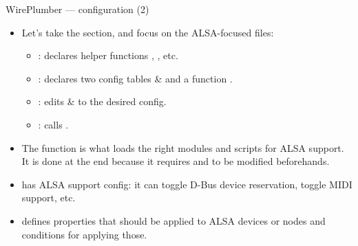\begin{frame}{WirePlumber — configuration (2)}
  \begin{itemize}

  \item Let's take the  section, and focus on the
    ALSA-focused files:

    \begin{itemize}
    \item {}: declares helper functions
      , , etc.
    \item {}: declares two config tables
       \&  and a
      function .
    \item {}: edits 
      \&  to the desired config.
    \item {}: calls .
    \end{itemize}

  \item The  function is what loads the right modules
    and scripts for ALSA support. It is done at the end because it
    requires  and  to be modified
    beforehands.

  \item {} has ALSA support config: it can toggle D-Bus
    device reservation, toggle MIDI support, etc.

  \item {} defines properties that should be applied to ALSA
    devices or nodes and conditions for applying those.

  \end{itemize}
\end{frame}



